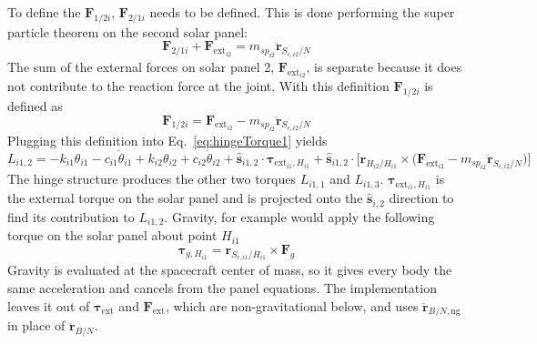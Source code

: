 To define the $\bm F_{1/2i}$, $\bm F_{2/1i}$ needs to be defined. This is done performing the super particle theorem on the second solar panel:
\begin{equation}
	\bm F_{2/1i} + \bm F_{\text{ext}_{i2}} = m_{sp_{i2}} \ddot{\bm{r}}_{S_{c,i2}/N}
\end{equation}
The sum of the external forces on solar panel 2, $\bm F_{\text{ext}_{i2}}$, is separate because it does not contribute to the reaction force at the joint. With this definition $\bm F_{1/2i}$ is defined as
\begin{equation}
	\bm F_{1/2i} = \bm F_{\text{ext}_{i2}}  - m_{sp_{i2}} \ddot{\bm{r}}_{S_{c,i2}/N}
\end{equation}
Plugging this definition into Eq.~\eqref{eq:hingeTorque1} yields
\begin{equation}
	L_{i1,2} = - k_{i1} \theta_{i1} - c_{i1}\dot{\theta}_{i1} +  k_{i2} \theta_{i2} + c_{i2} \dot\theta_{i2} + \hat{\bm s}_{i1,2} \cdot \bm \tau_{\text{ext}_{i1},H_{i1}} + \hat{\bm s}_{i1,2} \cdot \Big[\bm{r}_{H_{i2}/H_{i1}} \times \big(\bm F_{\text{ext}_{i2}}  - m_{sp_{i2}} \ddot{\bm{r}}_{S_{c,i2}/N}\big)\Big]
	\label{eq:hingeTorque2}
\end{equation}
The hinge structure produces the other two torques $L_{i1,1}$ and $L_{i1,3}$. $\bm \tau_{\text{ext}_{i1},H_{i1}}$ is the external torque on the solar panel and is projected onto the $\hat{\bm s}_{i,2}$ direction to find its contribution to $L_{i1,2}$. Gravity, for example would apply the following torque on the solar panel about point $H_{i1}$
\begin{equation}
	\bm \tau_{g,H_{i1}} = \bm r_{S_{c,i1}/H_{i1}} \times \bm F_g
\end{equation}
Gravity is evaluated at the spacecraft center of mass, so it gives every body the same acceleration and cancels from the panel equations. The implementation leaves it out of $\bm\tau_{\text{ext}}$ and $\bm F_{\text{ext}}$, which are non-gravitational below, and uses $\ddot{\bm r}_{B/N,\text{ng}}$ in place of $\ddot{\bm r}_{B/N}$.

